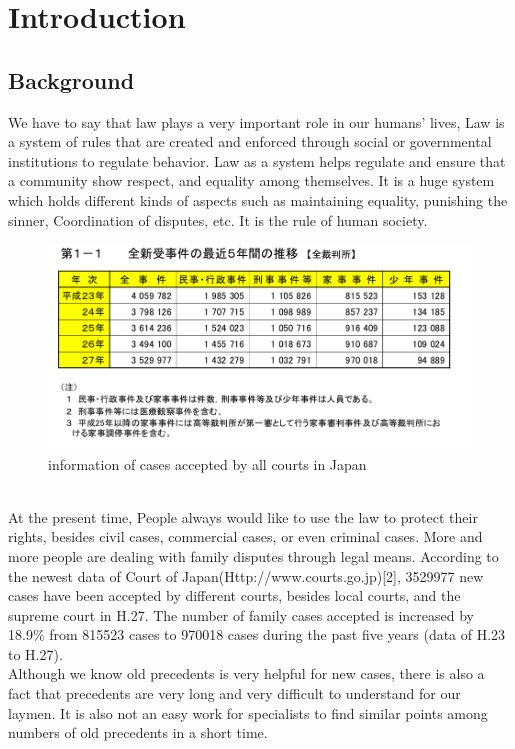 \chapter{Introduction}
\section{Background}
We have to say that law plays a very important role in our humans' lives, Law is a system of rules that are created and enforced through social or governmental institutions to regulate behavior.
Law as a system helps regulate and ensure that a community show respect, and equality among themselves. It is a huge system which holds different kinds of aspects such as maintaining equality, punishing the sinner, Coordination of disputes, etc. It is the rule of human society.
\begin{figure}[!h]
\centering
\includegraphics[width=350pt]{./pictures/0101.png}
\caption{information of cases accepted by all courts in Japan}
\end{figure}
\\At the present time, People always would like to use the law to protect their rights, besides civil cases, commercial cases, or even criminal cases. More and more people are dealing with family disputes through legal means. According to the newest data of Court of Japan(Http://www.courts.go.jp)[2], 3529977 new cases have been accepted by different courts, besides local courts, and the supreme court in H.27. The number of family cases accepted is increased by 18.9\% from 815523 cases to 970018 cases during the past five years (data of H.23 to H.27).
\\
Although we know old precedents is very helpful for new cases, there is also a fact that precedents are very long and very difficult to understand for our laymen. It is also not an easy work for specialists to find similar points among numbers of old precedents in a short time.
\\
